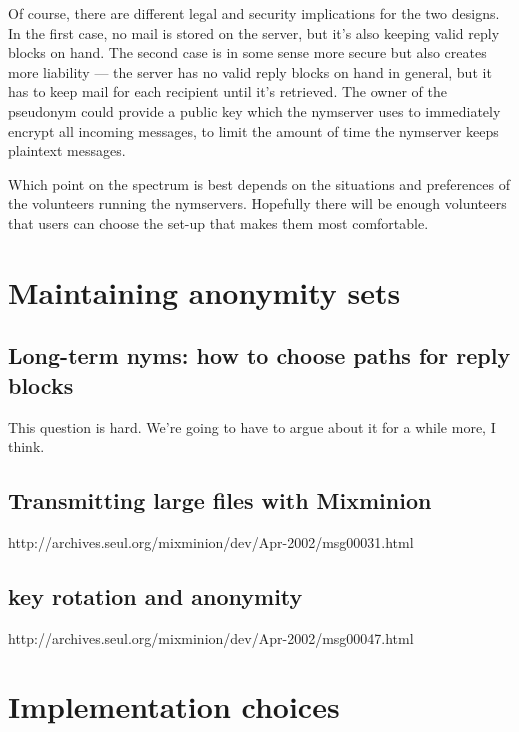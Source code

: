 \documentclass{llncs}
\begin{document}
Of course, there are different legal and security implications for the two
designs. In the first case, no mail is stored on the server, but it's also
keeping valid reply blocks on hand. The second case is in some sense more
secure but also creates more liability --- the server has no valid reply
blocks on hand in general, but it has to keep mail for each recipient
until it's retrieved. The owner of the pseudonym could provide a public
key which the nymserver uses to immediately encrypt all incoming messages,
to limit the amount of time the nymserver keeps plaintext messages.

Which point on the spectrum is best depends on the situations and
preferences of the volunteers running the nymservers. Hopefully there
will be enough volunteers that users can choose the set-up that makes
them most comfortable.


\section{Maintaining anonymity sets}

\subsection{Long-term nyms: how to choose paths for reply blocks}

This question is hard. We're going to have to argue about it for a
while more, I think.

\subsection{Transmitting large files with Mixminion}

http://archives.seul.org/mixminion/dev/Apr-2002/msg00031.html

\subsection{key rotation and anonymity}

http://archives.seul.org/mixminion/dev/Apr-2002/msg00047.html


\section{Implementation choices}
\label{sec:implementation}
\end{document}
